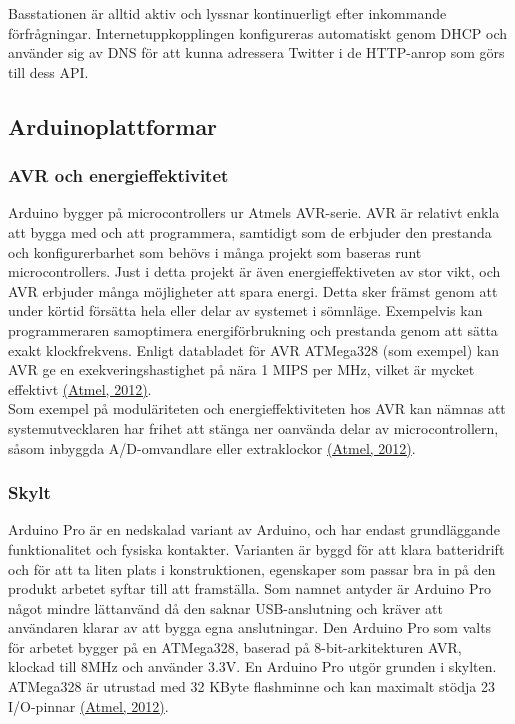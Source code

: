 \documentclass[a4paper,11pt]{article}
\begin{document}
Basstationen är alltid aktiv och lyssnar kontinuerligt efter inkommande förfrågningar. Internetuppkopplingen konfigureras automatiskt genom DHCP och använder sig av DNS för att kunna adressera Twitter i de HTTP-anrop som görs till dess API.

\subsection{Arduinoplattformar}

\subsubsection{AVR och energieffektivitet}
Arduino bygger på microcontrollers ur Atmels AVR-serie. AVR är relativt enkla att bygga med och att programmera, samtidigt som de erbjuder den prestanda och konfigurerbarhet som behövs i många projekt som baseras runt microcontrollers. Just i detta projekt är även energieffektiveten av stor vikt, och AVR erbjuder många möjligheter att spara energi. Detta sker främst genom att under körtid försätta hela eller delar av systemet i sömnläge. Exempelvis kan programmeraren samoptimera energiförbrukning och prestanda genom att sätta exakt klockfrekvens. Enligt databladet för AVR ATMega328 (som exempel) kan AVR ge en exekveringshastighet på nära 1 MIPS per MHz, vilket är mycket effektivt \hyperref[atmel]{(Atmel, 2012)}. \\

Som exempel på moduläriteten och energieffektiviteten hos AVR kan nämnas att systemutvecklaren har frihet att stänga ner oanvända delar av microcontrollern, såsom inbyggda A/D-omvandlare eller extraklockor \hyperref[atmel]{(Atmel, 2012)}.

\subsubsection{Skylt}
Arduino Pro är en nedskalad variant av Arduino, och har endast grundläggande funktionalitet och fysiska kontakter. Varianten är byggd för att klara batteridrift och för att ta liten plats i konstruktionen, egenskaper som passar bra in på den produkt arbetet syftar till att framställa. Som namnet antyder är Arduino Pro något mindre lättanvänd då den saknar USB-anslutning och kräver att användaren klarar av att bygga egna anslutningar. Den Arduino Pro som valts för arbetet bygger på en ATMega328, baserad på 8-bit-arkitekturen AVR, klockad till 8MHz och använder 3.3V. En Arduino Pro utgör grunden i skylten. ATMega328 är utrustad med 32 KByte flashminne och kan maximalt stödja 23 I/O-pinnar \hyperref[atmel]{(Atmel, 2012)}.
\end{document}
